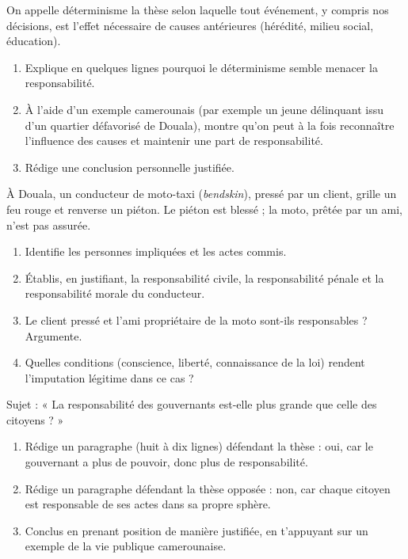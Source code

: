 \documentclass[11pt]{article}
\newcommand{\cle}[1]{{\popxbold\color{popdark}#1}}
\begin{document}
\begin{exercice}
On appelle \cle{déterminisme} la thèse selon laquelle tout événement, y compris nos décisions, est l'effet nécessaire de causes antérieures (hérédité, milieu social, éducation).
\begin{enumerate}
\item Explique en quelques lignes pourquoi le déterminisme semble menacer la responsabilité.
\item À l'aide d'un exemple camerounais (par exemple un jeune délinquant issu d'un quartier défavorisé de Douala), montre qu'on peut à la fois reconnaître l'influence des causes et maintenir une part de responsabilité.
\item Rédige une conclusion personnelle justifiée.
\end{enumerate}
\end{exercice}

\begin{exercice}
À Douala, un conducteur de moto-taxi (\emph{bendskin}), pressé par un client, grille un feu rouge et renverse un piéton. Le piéton est blessé ; la moto, prêtée par un ami, n'est pas assurée.
\begin{enumerate}
\item Identifie les personnes impliquées et les actes commis.
\item Établis, en justifiant, la responsabilité \cle{civile}, la responsabilité \cle{pénale} et la responsabilité \cle{morale} du conducteur.
\item Le client pressé et l'ami propriétaire de la moto sont-ils responsables ? Argumente.
\item Quelles conditions (conscience, liberté, connaissance de la loi) rendent l'\cle{imputation} légitime dans ce cas ?
\end{enumerate}
\end{exercice}

\begin{exercice}
Sujet : « La responsabilité des gouvernants est-elle plus grande que celle des citoyens ? »
\begin{enumerate}
\item Rédige un paragraphe (huit à dix lignes) défendant la thèse : oui, car le gouvernant a plus de pouvoir, donc plus de responsabilité.
\item Rédige un paragraphe défendant la thèse opposée : non, car chaque citoyen est responsable de ses actes dans sa propre sphère.
\item Conclus en prenant position de manière justifiée, en t'appuyant sur un exemple de la vie publique camerounaise.
\end{enumerate}
\end{exercice}
\end{document}
